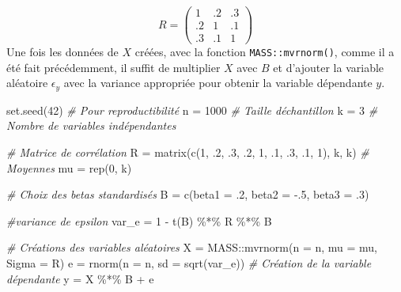 \documentclass[
]{book}
\newenvironment{Shaded}{}{}
\newcommand{\AttributeTok}[1]{#1}
\newcommand{\CommentTok}[1]{\textit{#1}}
\newcommand{\DecValTok}[1]{#1}
\newcommand{\FunctionTok}[1]{#1}
\newcommand{\NormalTok}[1]{#1}
\newcommand{\OtherTok}[1]{#1}
\newcommand{\SpecialCharTok}[1]{#1}
\begin{document}
\[
R= \left( 
\begin{array}{ccc}
1 & .2 & .3\\
.2 & 1 & .1\\
.3 & .1 & 1
\end{array}
\right)
\]
Une fois les données de \(X\) créées, avec la fonction \texttt{MASS::mvrnorm()}, comme il a été fait précédemment, il suffit de multiplier \(X\) avec \(B\) et d'ajouter la variable aléatoire \(\epsilon_y\) avec la variance appropriée pour obtenir la variable dépendante \(y\).

\begin{Shaded}
\begin{Highlighting}[]
\FunctionTok{set.seed}\NormalTok{(}\DecValTok{42}\NormalTok{)  }\CommentTok{\# Pour reproductibilité}
\NormalTok{n }\OtherTok{=} \DecValTok{1000}      \CommentTok{\# Taille d\textquotesingle{}échantillon}
\NormalTok{k }\OtherTok{=} \DecValTok{3}         \CommentTok{\# Nombre de variables indépendantes}

\CommentTok{\# Matrice de corrélation}
\NormalTok{R }\OtherTok{=} \FunctionTok{matrix}\NormalTok{(}\FunctionTok{c}\NormalTok{(}\DecValTok{1}\NormalTok{, .}\DecValTok{2}\NormalTok{, .}\DecValTok{3}\NormalTok{,}
\NormalTok{             .}\DecValTok{2}\NormalTok{, }\DecValTok{1}\NormalTok{, .}\DecValTok{1}\NormalTok{,}
\NormalTok{             .}\DecValTok{3}\NormalTok{, .}\DecValTok{1}\NormalTok{, }\DecValTok{1}\NormalTok{), k, k)}
\CommentTok{\# Moyennes}
\NormalTok{mu }\OtherTok{=} \FunctionTok{rep}\NormalTok{(}\DecValTok{0}\NormalTok{, k)}

\CommentTok{\# Choix des betas standardisés}
\NormalTok{B }\OtherTok{=} \FunctionTok{c}\NormalTok{(}\AttributeTok{beta1 =}\NormalTok{ .}\DecValTok{2}\NormalTok{, }\AttributeTok{beta2 =} \SpecialCharTok{{-}}\NormalTok{.}\DecValTok{5}\NormalTok{, }\AttributeTok{beta3 =}\NormalTok{ .}\DecValTok{3}\NormalTok{)}

\CommentTok{\#variance de epsilon}
\NormalTok{var\_e }\OtherTok{=} \DecValTok{1} \SpecialCharTok{{-}} \FunctionTok{t}\NormalTok{(B) }\SpecialCharTok{\%*\%}\NormalTok{ R }\SpecialCharTok{\%*\%}\NormalTok{ B}

\CommentTok{\# Créations des variables aléatoires}
\NormalTok{X }\OtherTok{=}\NormalTok{ MASS}\SpecialCharTok{::}\FunctionTok{mvrnorm}\NormalTok{(}\AttributeTok{n =}\NormalTok{ n, }\AttributeTok{mu =}\NormalTok{ mu, }\AttributeTok{Sigma =}\NormalTok{ R)}
\NormalTok{e }\OtherTok{=} \FunctionTok{rnorm}\NormalTok{(}\AttributeTok{n =}\NormalTok{ n, }\AttributeTok{sd =} \FunctionTok{sqrt}\NormalTok{(var\_e))}
\CommentTok{\# Création de la variable dépendante}
\NormalTok{y }\OtherTok{=}\NormalTok{ X }\SpecialCharTok{\%*\%}\NormalTok{ B }\SpecialCharTok{+}\NormalTok{ e}


\end{Highlighting}
\end{Shaded}
\end{document}
